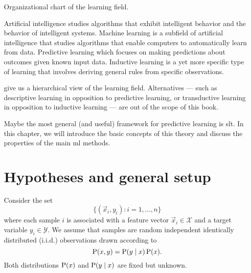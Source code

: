 \begin{figurebox}[label=fig:learning]{Organizational chart of the learning field.}
  \centering
  \tcblower
  Artificial intelligence studies algorithms that exhibit intelligent behavior and the
  behavior of intelligent systems.  Machine learning is a subfield of artificial
  intelligence that studies algorithms that enable computers to automatically learn from
  data.  Predictive learning which focuses on making predictions about outcomes given
  known input data.  Inductive learning is a yet more specific type of learning that
  involves deriving general rules from specific observations.
\end{figurebox}

 give us a hierarchical view of the learning field.  Alternatives ---
such as descriptive learning in opposition to predictive learning, or transductive
learning in opposition to inductive learning --- are out of the scope of this book.

Maybe the most general (and useful) framework for predictive learning is \gls{slt}.
In this chapter, we will introduce the basic concepts of this theory and discuss the
properties of the main \gls{ml} methods.

\section{Hypotheses and general setup}

Consider the set
\begin{equation}
  \label{eq:training-set}
  \big\{(\vec{x}_i, y_i) : i = 1, \dots, n \big\}
\end{equation}
where each sample $i$ is associated with a feature vector $\vec{x}_i \in \mathcal{X}$ and a target variable
$y_i \in \mathcal{Y}$.  We assume that samples are random independent identically
distributed (i.i.d.) observations drawn according to $$\operatorname{P}(x, y) = \operatorname{P}(y \mid x) \operatorname{P}(x)\text{.}$$
Both distributions $\operatorname{P}(x)$ and $\operatorname{P}(y \mid x)$ are fixed but unknown.

